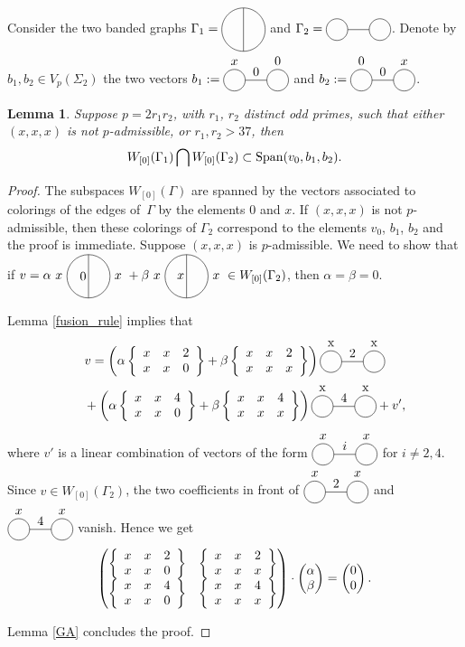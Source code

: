 \documentclass[pdftex]{sigma}
\numberwithin{equation}{section}
\newtheorem{Lemma}[Theorem]{Lemma}
\begin{document}
 Consider the two banded graphs $\Gamma_1= \Thetagraph$ and $\Gamma_2=\Eyesgraph$. Denote by $b_1, b_2 \in V_p(\Sigma_2)$ the two vectors $b_1:= \eyesgraph{$x$}{0}{0}$ and $b_2 := \eyesgraph{0}{0}{$x$}$.

\begin{Lemma}\label{lemma_2r1r2}
Suppose $p=2r_1r_2$, with $r_1$, $r_2$ distinct odd primes, such that either $(x,x,x)$ is not $p$-admissible, or $r_1,r_2>37$, then
\begin{gather*} W_{[0]}(\Gamma_1) \bigcap W_{[0]}(\Gamma_2) \subset \operatorname{Span} ( v_0, b_1, b_2 ).\end{gather*}
\end{Lemma}

\begin{proof}The subspaces $W_{[0]}(\Gamma)$ are spanned by the vectors associated to colorings of the edges of~$\Gamma$ by the elements $0$ and $x$. If $(x,x,x)$ is not $p$-admissible, then these colorings of $\Gamma_2$ correspond to the elements $v_0$, $b_1$, $b_2$ and the proof is immediate. Suppose $(x,x,x)$ is $p$-admissible. We need to show that if $v=\alpha \thetagraph{$x$}{0}{$x$} + \beta \thetagraph{$x$}{$x$}{$x$} \in W_{[0]}(\Gamma_2)$, then $\alpha=\beta = 0$.

Lemma \ref{fusion_rule} implies that
\begin{gather*}
v= \left( \alpha \sixj{x}{x}{2}{x}{x}{0} +\beta \sixj{x}{x}{2}{x}{x}{x} \right) \eyesgraph{x}{2}{x}\\
\hphantom{v=}{}+ \left( \alpha \sixj{x}{x}{4}{x}{x}{0} +\beta \sixj{x}{x}{4}{x}{x}{x} \right) \eyesgraph{x}{4}{x} + v',
\end{gather*}
where $v'$ is a linear combination of vectors of the form $\eyesgraph{$x$}{$i$}{$x$}$ for $i\neq 2,4$. Since $v\in W_{[0]}(\Gamma_2)$, the two coefficients in front of $\eyesgraph{$x$}{2}{$x$}$ and $\eyesgraph{$x$}{4}{$x$}$ vanish. Hence we get
\begin{gather*}\begin{pmatrix} \left\{ \begin{array}{ccc} x & x & 2 \\ x & x & 0 \end{array} \right\} & \left\{ \begin{array}{ccc} x & x & 2 \\ x & x & x \end{array} \right\} \\ \left\{ \begin{array}{ccc} x & x & 4 \\ x & x & 0 \end{array} \right\} & \left\{ \begin{array}{ccc} x & x & 4 \\ x & x & x \end{array} \right\} \end{pmatrix} \cdot \begin{pmatrix} \alpha \\ \beta \end{pmatrix} = \begin{pmatrix} 0\\0 \end{pmatrix}.\end{gather*}

Lemma \ref{GA} concludes the proof.
\end{proof}
\end{document}
